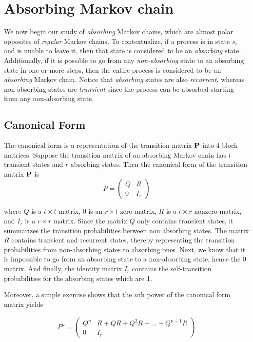\documentclass[a4paper,12pt]{article}
\theoremstyle{definition}
\let\oldtextbf\mathbf
\renewcommand{\mathbf}[1]{\oldtextbf{\boldmath #1}}
\begin{document}
\section*{Absorbing Markov chain}

	We now begin our study of \emph{absorbing} Markov chains, which are almost polar opposites of \emph{regular} Markov chains. 
	To contextualize, if a process is in state $s_i$ and is unable to leave it, then that state is considered to be an \emph{absorbing} 
	state. Additionally, if it is possible to go from any \emph{non-absorbing} state to an absorbing state in one or more steps, then 
	the entire process is considered to be an \emph{absorbing} Markov chain. Notice that \emph{absorbing} states are also 
	\emph{recurrent}, whereas non-absorbing states are \emph{transient} since the process can be absorbed starting from any 
	non-absorbing state.	
	
	\subsection*{Canonical Form}
	
	The canonical form is a representation of the transition matrix $\mathbf{P}$ into 4 block matrices. Suppose the transition matrix 
	of an absorbing Markov chain has $t$ transient states and $r$ absorbing states. Then the canonical form of the 
	transition matrix $\mathbf{P}$ is
	 \[
    P = \left(
    \begin{array}{c|c}
      Q & R\\
      \hline
      0 & I_r
    \end{array}
    \right)
  \]
  
	where $Q$ is a $t \times t$ matrix, $0$ is an $r \times t$ zero matrix, $R$ is a $t \times r$ nonzero matrix, and $I_r$ is a 
	$r \times r$ matrix. Since the matrix $Q$ only contains transient states, it summarizes the transition probabilities 
	between non absorbing states. The matrix $R$ contains transient and recurrent states, thereby representing the transition 
	probabilities from non-absorbing states to absorbing ones. Next, we know that it is impossible to go from an absorbing state 
	to a non-absorbing state, hence the $0$ matrix. And finally, the identity matrix $I_r$ contains the self-transition 
	probabilities for the absorbing states which are 1.

Moreover, a simple exercise shows that the $n$th power of the canonical form matrix yields

	\begin{equation*}
	\begin{aligned}
		P^n = \left(
		\begin{array}{c|c}
		Q^n & R + QR + Q^2R + ... + Q^{n-1}R\\
		\hline
		0 & I_r
		\end{array}
    	\right)
	\end{aligned}
	\end{equation*}	
\end{document}
